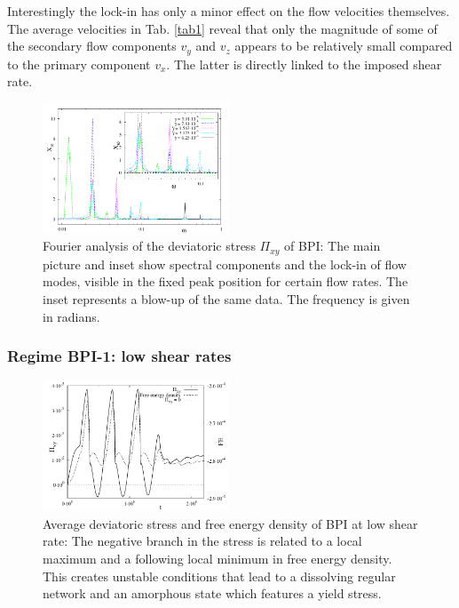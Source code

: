 \documentclass[aps,pre,reprint,superscriptaddress, twocolumn]{revtex4}
\begin{document}
Interestingly the lock-in has only a minor effect on the flow velocities themselves.
The average velocities in Tab. \ref{tab1} reveal that only the magnitude of some of the secondary 
flow components $v_y$ and $v_z$ appears to be relatively small compared to the primary component $v_x$. 
The latter is directly linked to the imposed shear rate. 

\begin{figure}[htpb]
\includegraphics[width=0.495\textwidth]{spectrum_bp1.pdf}
\caption{Fourier analysis of the deviatoric stress $\Pi_{xy}$ of BPI: The main picture and inset show spectral
components and the lock-in of flow modes, visible in the fixed peak position for certain flow rates. 
The inset represents a blow-up of the same data. The frequency is given in radians.}
\label{bp1-spectrum}
\end{figure}

\subsubsection{Regime BPI-1: low shear rates}

\begin{figure}[htpb]
\includegraphics[width=0.495\textwidth]{stress_fe_yield_bp1.pdf}
\caption{Average deviatoric stress and free energy density of BPI at low shear rate: The negative branch in the stress is related to a local maximum and a following local minimum in free energy density. This creates unstable conditions that lead to a dissolving regular network and an amorphous state which features a yield stress.}
\label{bp1-fe-yield}
\end{figure}
\end{document}
